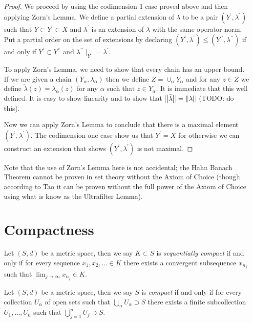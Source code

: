 \begin{proof}We proceed by using the codimension 1 case proved above
  and then applying Zorn's Lemma.  We define a partial extension of
  $\lambda$ to be a pair $(Y^\prime, \lambda^\prime)$ such that $Y
  \subset Y^\prime \subset X$ and $\lambda^\prime$ is an extension of
  $\lambda$ with the same operator norm.  Put a partial order on the
  set of extensions by declaring $(Y^\prime, \lambda^\prime) \leq
  (Y^{\prime\prime}, \lambda^{\prime\prime})$ if and only if $Y^\prime
  \subset Y^{\prime\prime}$ and $\lambda^{\prime\prime}\mid_{Y^\prime}
  = \lambda^\prime$.

To apply Zorn's Lemma, we need to show that every chain has an upper
bound.  If we are given a chain $(Y_\alpha, \lambda_\alpha)$ then we
define $Z = \cup_\alpha Y_\alpha$ and for any $z \in Z$ we define
$\tilde{\lambda}(z) = \lambda_\alpha(z)$ for any $\alpha$ such that $z \in
Y_\alpha$.  It is immediate that this well defined.  It is easy to
show linearity and to show that $\left \lVert \tilde{\lambda} \right \rVert =
\left \lVert \lambda \right \rVert$ (TODO: do this).

Now we can apply Zorn's Lemma to conclude that there is a maximal
element $(Y^\prime, \lambda^\prime)$.  The codimension one case show
us that $Y^\prime = X$ for otherwise we can construct an extension
that shows $(Y^\prime, \lambda^\prime)$ is not maximal.
\end{proof}
Note that the use of Zorn's Lemma here is not accidental; the Hahn
Banach Theorem cannot be proven in set theory without the Axiom of
Choice (though according to Tao it can be proven without the full
power of the Axiom of Choice using what is know as the Ultrafilter Lemma).
\section{Compactness}

\begin{defn}Let $(S,d)$ be a metric space, then we say $K \subset S$
  is \emph{sequentially compact} if and only if for every sequence $x_1, x_2,
  \dots \in K$ there exists a convergent subsequence $x_{n_j}$ such
  that $\lim_{j \to \infty} x_{n_j} \in K$.
\end{defn}

\begin{defn}Let $(S,d)$ be a metric space, then we say $S$
  is \emph{compact} if and only if for every collection $U_\alpha$ of
  open sets such that $\bigcup_\alpha U_\alpha \supset S$ there
  exists a finite subcollection $U_1, \dots, U_n$ such that
  $\bigcup_{j=1}^n U_j \supset S$.
\end{defn}

